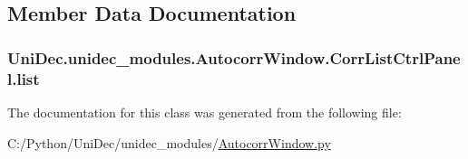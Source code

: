 \subsection{Member Data Documentation}
\hypertarget{class_uni_dec_1_1unidec__modules_1_1_autocorr_window_1_1_corr_list_ctrl_panel_aae53aa0f9a7644c3dd7729bb06321fcd}{}
\subsubsection[{list}]{\setlength{\rightskip}{0pt plus 5cm}Uni\+Dec.\+unidec\+\_\+modules.\+Autocorr\+Window.\+Corr\+List\+Ctrl\+Panel.\+list}\label{class_uni_dec_1_1unidec__modules_1_1_autocorr_window_1_1_corr_list_ctrl_panel_aae53aa0f9a7644c3dd7729bb06321fcd}


The documentation for this class was generated from the following file\+:\begin{DoxyCompactItemize}
\item 
C\+:/\+Python/\+Uni\+Dec/unidec\+\_\+modules/\hyperlink{_autocorr_window_8py}{Autocorr\+Window.\+py}\end{DoxyCompactItemize}
